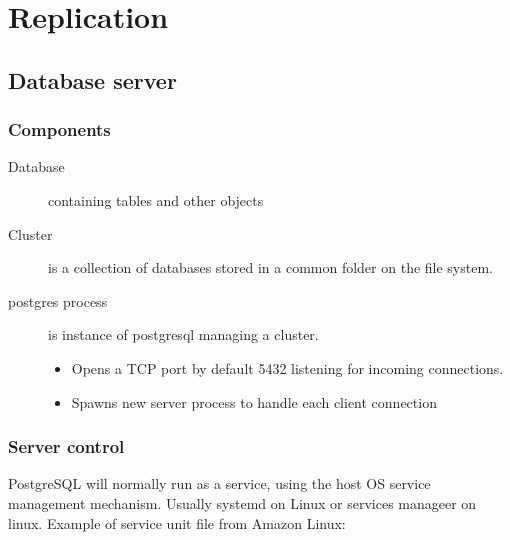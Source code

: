 \chapter{Replication}


  

\section{Database server}

\subsection{Components}

\begin{description}
\item[Database] containing tables and other objects
\item[Cluster] is a collection of databases stored in a common folder on the file system.
\item[postgres process] is instance of postgresql managing a cluster.
  \begin{itemize}
  \item Opens a TCP port by default 5432 listening for incoming connections.
  \item Spawns new server process to handle each client connection
  \end{itemize}
\end{description}

\subsection{Server control}

PostgreSQL will normally run as a service, using the host OS service management mechanism.
Usually systemd on Linux or services manageer on linux. 
Example of service unit file from Amazon Linux: 
\inputminted{ini}{pgsql.service.txt}


